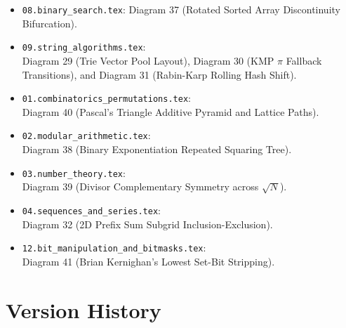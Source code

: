 \documentclass[11pt,a4paper]{article}
\begin{document}
\begin{enumerate}
\begin{itemize}
        \item \texttt{08.binary\_search.tex}: Diagram 37 (Rotated Sorted Array Discontinuity Bifurcation).
        \item \texttt{09.string\_algorithms.tex}:\\ Diagram 29 (Trie Vector Pool Layout), Diagram 30 (KMP $\pi$ Fallback Transitions), and Diagram 31 (Rabin-Karp Rolling Hash Shift).
        \item \texttt{01.combinatorics\_permutations.tex}:\\ Diagram 40 (Pascal's Triangle Additive Pyramid and Lattice Paths).
        \item \texttt{02.modular\_arithmetic.tex}:\\ Diagram 38 (Binary Exponentiation Repeated Squaring Tree).
        \item \texttt{03.number\_theory.tex}:\\ Diagram 39 (Divisor Complementary Symmetry across $\sqrt{N}$).
        \item \texttt{04.sequences\_and\_series.tex}:\\ Diagram 32 (2D Prefix Sum Subgrid Inclusion-Exclusion).
        \item \texttt{12.bit\_manipulation\_and\_bitmasks.tex}:\\ Diagram 41 (Brian Kernighan's Lowest Set-Bit Stripping).
    \end{itemize}
\end{enumerate}

\section*{Version History}
\end{document}

